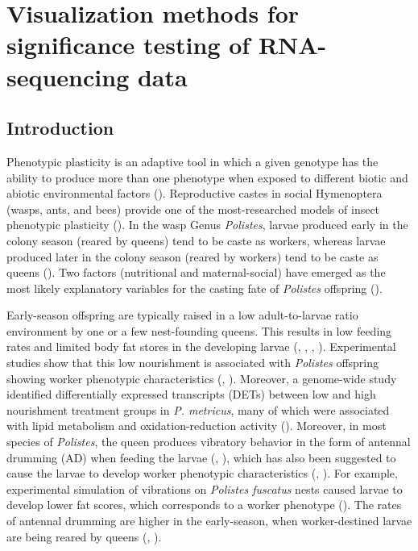 \documentclass[11pt,a4paper,oldfontcommands,openany]{memoir}
\numberwithin{equation}{section} %
\begin{document}

\chapter{Visualization methods for significance testing of RNA-sequencing data}
\label{sec:sigtest}

\section{Introduction}

Phenotypic plasticity is an adaptive tool in which a given genotype has the ability to produce more than one phenotype when exposed to different biotic and abiotic environmental factors (\citealt{pw4}). Reproductive castes in social Hymenoptera (wasps, ants, and bees) provide one of the most-researched models of insect phenotypic plasticity (\citealt{pw5}). In the wasp Genus \textit{Polistes}, larvae produced early in the colony season (reared by queens) tend to be caste as workers, whereas larvae produced later in the colony season (reared by workers) tend to be caste as queens (\citealt{pw3}). Two factors (nutritional and maternal-social) have emerged as the most likely explanatory variables for the casting fate of \textit{Polistes} offspring (\citealt{pw3}).

Early-season offspring are typically raised in a low adult-to-larvae ratio environment by one or a few nest-founding queens. This results in low feeding rates and limited body fat stores in the developing larvae (\citealt{pw6}, \citealt{pw7}, \citealt{pw8}, \citealt{pw9}). Experimental studies show that this low nourishment is associated with \textit{Polistes} offspring showing worker phenotypic characteristics (\citealt{pw10}, \citealt{pw11}). Moreover, a genome-wide study identified differentially expressed transcripts (DETs) between low and high nourishment treatment groups in \textit{P. metricus}, many of which were associated with lipid metabolism and oxidation-reduction activity (\citealt{pw1}). Moreover, in most species of \textit{Polistes}, the queen produces vibratory behavior in the form of antennal drumming (AD) when feeding the larvae (\citealt{pw12}, \citealt{pw13}), which has also been suggested to cause the larvae to develop worker phenotypic characteristics (\citealt{pw12}, \citealt{pw14}). For example, experimental simulation of vibrations on \textit{Polistes fuscatus} nests caused larvae to develop lower fat scores, which corresponds to a worker phenotype (\citealt{pw2}). The rates of antennal drumming are higher in the early-season, when worker-destined larvae are being reared by queens (\citealt{pw15}, \citealt{pw16}).
\end{document}
